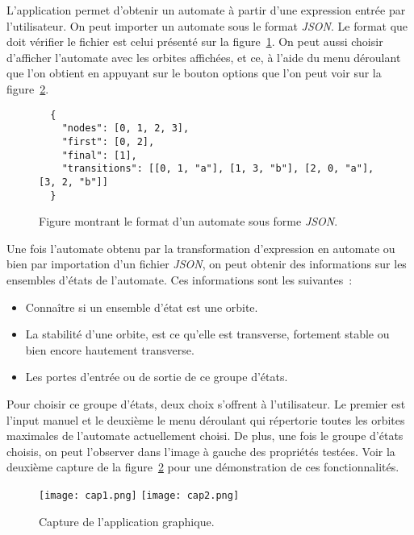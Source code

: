 L'application permet d'obtenir un automate à partir d'une expression entrée
par l'utilisateur. On peut importer un automate sous le format \textit{JSON}. Le
format que doit vérifier le fichier est celui présenté sur la
figure~\ref{fig:jsonFormat}. On peut aussi choisir d'afficher l'automate avec
les orbites affichées, et ce, à l'aide du menu déroulant que l'on obtient en
appuyant sur le bouton options que l'on peut voir sur la
figure~\ref{fig:cap1}.

\begin{figure}[H]
    \begin{verbatim}
  {
    "nodes": [0, 1, 2, 3],
    "first": [0, 2],
    "final": [1],
    "transitions": [[0, 1, "a"], [1, 3, "b"], [2, 0, "a"], [3, 2, "b"]] 
  }
  \end{verbatim}
    \caption{Figure montrant le format d'un automate sous forme \textit{JSON}.}
    \label{fig:jsonFormat}
\end{figure}

Une fois l'automate obtenu par la transformation d'expression en automate ou
bien par importation d'un fichier \textit{JSON}, on peut obtenir des
informations sur les ensembles d'états de l'automate. Ces informations sont les
suivantes~:

\begin{itemize}
    \item[\textbullet] Connaître si un ensemble d'état est une orbite.
    \item[\textbullet] La stabilité d'une orbite, est ce qu'elle est transverse,
        fortement stable ou bien encore hautement transverse.
    \item[\textbullet] Les portes d'entrée ou de sortie de ce groupe d'états.
\end{itemize}

Pour choisir ce groupe d'états, deux choix s'offrent à l'utilisateur. Le premier
est l'input manuel et le deuxième le menu déroulant qui répertorie toutes les
orbites maximales de l'automate actuellement choisi. De plus, une fois le
groupe d'états choisis, on peut l'observer dans l'image à gauche des propriétés
testées. Voir la deuxième capture de la figure~\ref{fig:cap1} pour une
démonstration de ces fonctionnalités.

\begin{figure}[H]
    \texttt{[image: cap1.png]}
    \texttt{[image: cap2.png]}
    \caption{Capture de l'application graphique.}\label{fig:cap1}
\end{figure}

